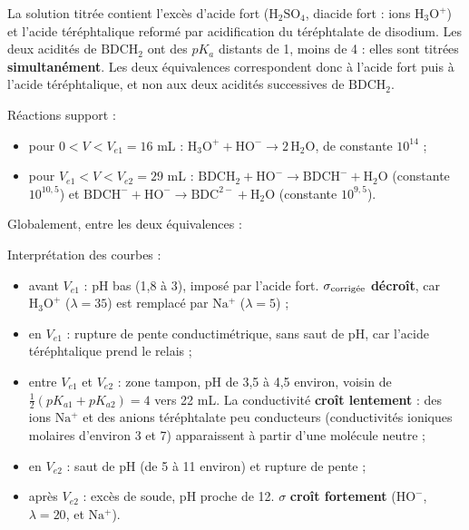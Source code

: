 \documentclass[11pt,a4paper]{article}
\providecommand{\tightlist}{\setlength{\itemsep}{0pt}\setlength{\parskip}{0pt}}
\newcommand{\equationajustee}[1]{%
  \sbox{\boiteequation}{$\displaystyle #1$}%
  \ifdim\wd\boiteequation>\linewidth
    \[\resizebox{\linewidth}{!}{\usebox{\boiteequation}}\]%
  \else
    \[#1\]%
  \fi}
\begin{document}
La solution titrée contient l'excès d'acide fort (\(\mathrm{H_2SO_4}\), diacide fort : ions \(\mathrm{H_3O^+}\)) et l'acide téréphtalique reformé par acidification du téréphtalate de disodium. Les deux acidités de \(\mathrm{BDCH_2}\) ont des \(pK_a\) distants de 1, moins de 4 : elles sont titrées \textbf{simultanément}. Les deux équivalences correspondent donc à l'acide fort puis à l'acide téréphtalique, et non aux deux acidités successives de \(\mathrm{BDCH_2}\).

Réactions support :

\begin{itemize}
\tightlist
\item
  pour \(0<V<V_{e1}=16\) mL : \(\mathrm{H_3O^+}+\mathrm{HO^-}\to2\,\mathrm{H_2O}\), de constante \(10^{14}\) ;
\item
  pour \(V_{e1}<V<V_{e2}=29\) mL : \(\mathrm{BDCH_2}+\mathrm{HO^-}\to\mathrm{BDCH^-}+\mathrm{H_2O}\) (constante \(10^{10{,}5}\)) et \(\mathrm{BDCH^-}+\mathrm{HO^-}\to\mathrm{BDC^{2-}}+\mathrm{H_2O}\) (constante \(10^{9{,}5}\)).
\end{itemize}

Globalement, entre les deux équivalences :

\equationajustee{\mathrm{BDCH_2}+2\,\mathrm{HO^-}\longrightarrow\mathrm{BDC^{2-}}+2\,\mathrm{H_2O}}

Interprétation des courbes :

\begin{itemize}
\tightlist
\item
  avant \(V_{e1}\) : pH bas (1,8 à 3), imposé par l'acide fort. \(\sigma_{\rm \text{corrigée}}\) \textbf{décroît}, car \(\mathrm{H_3O^+}\) (\(\lambda=35\)) est remplacé par \(\mathrm{Na^+}\) (\(\lambda=5\)) ;
\item
  en \(V_{e1}\) : rupture de pente conductimétrique, sans saut de pH, car l'acide téréphtalique prend le relais ;
\item
  entre \(V_{e1}\) et \(V_{e2}\) : zone tampon, pH de 3,5 à 4,5 environ, voisin de \(\frac12(pK_{a1}+pK_{a2})=4\) vers 22 mL. La conductivité \textbf{croît lentement} : des ions \(\mathrm{Na^+}\) et des anions téréphtalate peu conducteurs (conductivités ioniques molaires d'environ 3 et 7) apparaissent à partir d'une molécule neutre ;
\item
  en \(V_{e2}\) : saut de pH (de 5 à 11 environ) et rupture de pente ;
\item
  après \(V_{e2}\) : excès de soude, pH proche de 12. \(\sigma\) \textbf{croît fortement} (\(\mathrm{HO^-}\), \(\lambda=20\), et \(\mathrm{Na^+}\)).
\end{itemize}
\end{document}
